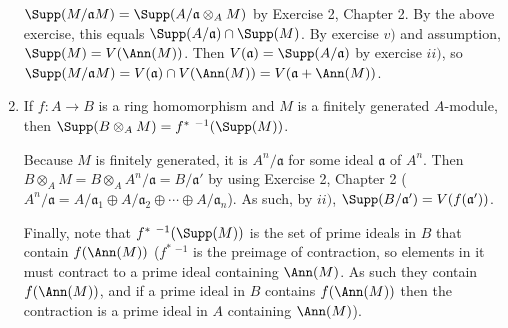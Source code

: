 \documentclass[a4paper]{exam}
\begin{document}
\begin{questions}
\begin{enumerate}
	\begin{solution}
		$\Supp(M / \mathfrak{a}M) = \Supp(A / \mathfrak{a} \otimes_A M) $ by Exercise 2, Chapter 2.
		By the above exercise, this equals $\Supp(A / \mathfrak{a}) \cap \Supp(M) $.
		By exercise $v) $ and assumption, $\Supp(M) = V(\Ann(M)) $.
		Then $V(\mathfrak{a}) = \Supp(A / \mathfrak{a}) $ by exercise $ii) $, so $\Supp(M / \mathfrak{a}M) = V(\mathfrak{a}) \cap V(\Ann(M)) = V(\mathfrak{a} + \Ann(M)) $.
	\end{solution}
	\item If $f: A\to B $ is a ring homomorphism and $M $ is a finitely generated $A $-module, then $\Supp(B \otimes _A M) = f^\ast\ ^{-1}(\Supp(M))$.
	\begin{solution}
		Because $M $ is finitely generated, it is $A^n / \mathfrak{a} $ for some ideal $\mathfrak{a} $ of $A^n $.
		Then $B \otimes _A M = B \otimes _A A^n / \mathfrak{a} = B / \mathfrak{a}' $ by using Exercise 2, Chapter 2 ($A^n / \mathfrak{a} = A / \mathfrak{a}_1 \oplus A / \mathfrak{a}_2 \oplus \cdots \oplus A / \mathfrak{a}_n$).
		As such, by $ii) $, $\Supp(B / \mathfrak{a}') = V(f(\mathfrak{a}'))$.

		Finally, note that $f^\ast\ ^{-1}(\Supp(M)) $ is the set of prime ideals in $B $ that contain $f(\Ann(M)) $ ($f^\ast\ ^{-1} $ is the preimage of contraction, so elements in it must contract to a prime ideal containing $\Ann(M) $.
		As such they contain $f(\Ann(M)) $, and if a prime ideal in $B $ contains $f(\Ann(M)) $ then the contraction is a prime ideal in $A $ containing $\Ann(M) $).
	\end{solution}
\end{enumerate}


\end{questions}
\end{document}
